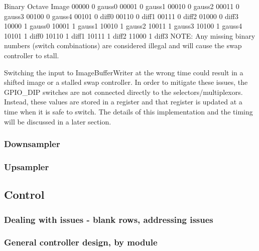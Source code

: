\documentclass[12pt]{article}
\begin{document}
Binary	Octave	Image
00000	0	gauss0
00001	0	gauss1
00010	0	gauss2
00011	0	gauss3
00100	0	gauss4
00101	0	diff0
00110	0	diff1
00111	0	diff2
01000	0	diff3
10000	1	gauss0
10001	1	gauss1
10010	1	gauss2
10011	1	gauss3
10100	1	gauss4
10101	1	diff0
10110	1	diff1
10111	1	diff2
11000	1	diff3
NOTE: Any missing binary numbers (switch combinations) are considered illegal 
and will cause the swap controller to stall.

Switching the input to ImageBufferWriter at the wrong time could result in 
a shifted image or a stalled swap controller. In order to mitigate these issues, 
the GPIO\_DIP switches are not connected directly to the selectors/multiplexors. 
Instead, these values are stored in a register and that register is updated at 
a time when it is safe to switch. The details of this implementation and the 
timing will be discussed in a later section.

\subsubsection{Downsampler}


\subsubsection{Upsampler}

\subsection{Control}

\subsubsection{Dealing with issues - blank rows, addressing issues}

\subsubsection{General controller design, by module}
\end{document}
